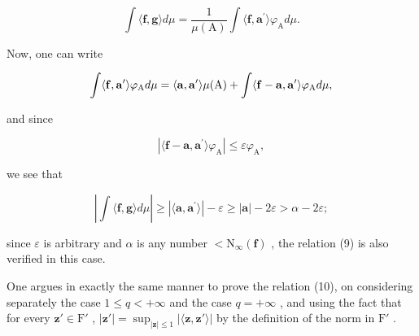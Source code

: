 \[
\int \langle \mathbf {f}, \mathbf {g} \rangle d \mu = \frac {1}{\mu (\mathrm{A})} \int \langle \mathbf {f}, \mathbf {a} ^ {\prime} \rangle \varphi_ {\mathrm{A}} d \mu .
\]

Now, one can write

\[
\int \langle {\bf f}, {\bf a} ^ {\prime} \rangle \varphi_ {\mathrm{A}} d \mu = \langle {\bf a}, {\bf a} ^ {\prime} \rangle \mu (\mathrm{A}) + \int \langle {\bf f} - {\bf a}, {\bf a} ^ {\prime} \rangle \varphi_ {\mathrm{A}} d \mu ,
\]

and since

\[
\left| \langle \mathbf {f} - \mathbf {a}, \mathbf {a} ^ {\prime} \rangle \varphi_ {\mathrm{A}} \right| \leqslant \varepsilon \varphi_ {\mathrm{A}},
\]

we see that

\[
\left| \int \langle \mathbf {f}, \mathbf {g} \rangle d \mu \right| \geqslant | \langle \mathbf {a}, \mathbf {a} ^ {\prime} \rangle | - \varepsilon \geqslant | \mathbf {a} | - 2 \varepsilon > \alpha - 2 \varepsilon ;
\]

since \(\varepsilon\) is arbitrary and \(\alpha\) is any number \(<\mathrm{N}_{\infty}(\mathbf{f})\) , the relation (9) is also verified in this case.

One argues in exactly the same manner to prove the relation (10), on considering separately the case \(1 \leqslant q < +\infty\) and the case \(q = +\infty\) , and using the fact that for every \(\mathbf{z}' \in \mathrm{F}'\) , \(|\mathbf{z}'| = \sup_{|\mathbf{z}| \leqslant 1} |\langle \mathbf{z}, \mathbf{z}' \rangle|\) by the definition of the norm in \(\mathrm{F}'\) .

